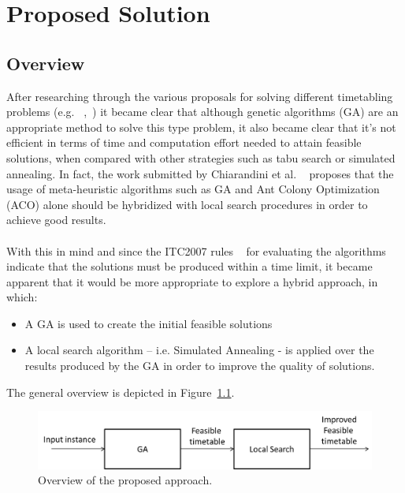 \chapter{Proposed Solution}
\label{implementation}
\thispagestyle{plain}

\section{Overview}
\label{subsubsec:solution-overview}
After researching through the various proposals for solving different timetabling problems (e.g. ~\cite{Bajeh2001},~\cite{Chiarandini2006}) it became clear that although genetic algorithms (GA) are an appropriate method to solve this type problem, it also became clear that it’s not efficient in terms of time and computation effort needed to attain feasible solutions, when compared with other strategies such as tabu search or simulated annealing. In fact, the work submitted by Chiarandini et al. ~\cite{Chiarandini2006} proposes that the usage of meta-heuristic algorithms such as GA and Ant Colony Optimization (ACO) alone should be hybridized with local search procedures in order to achieve good results.\\
\\
With this in mind and since the ITC2007 rules ~\cite{McCollum2007} for evaluating the algorithms indicate that the solutions must be produced within a time limit, it became apparent that it would be more appropriate to explore a hybrid approach, in which:\\
\begin{itemize}
\item A GA is used to create the initial feasible solutions 
\item	A local search algorithm – i.e. Simulated Annealing - is applied over the results produced by the GA in order to improve the quality of solutions.
\end{itemize}

The general overview is depicted in Figure~\ref{fig:overviewProposedApproach}.\\
\begin{figure}[h!]
 \centering
   \includegraphics[width=12.5cm]{./images/figures/Fig1_OverviewProposedApproach.png}
   \caption{Overview of the proposed approach.}
   \label{fig:overviewProposedApproach}
\end{figure}\\
